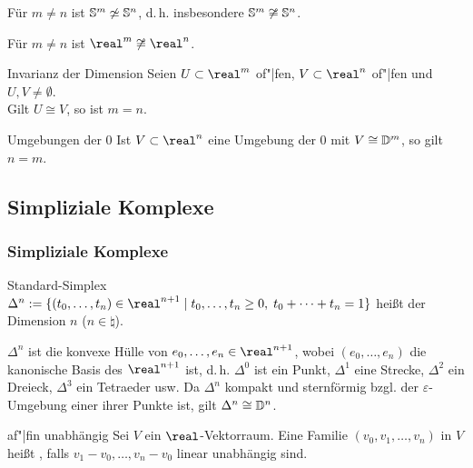 \begin{Kor}
    Für $m \not= n$ ist $\mathbb{S}^m \not\simeq \mathbb{S}^n$, d.\,h.
    insbesondere $\mathbb{S}^m \not\cong \mathbb{S}^n$.
\end{Kor}

\begin{Kor}
    Für $m \not= n$ ist $\real^m \not\cong \real^n$.
\end{Kor}

\begin{Satz}{Invarianz der Dimension}
    Seien $U \subset \real^m$ of"|fen, $V \subset \real^n$ of"|fen und
    $U, V \not= \emptyset$. \\
    Gilt $U \cong V$, so ist $m = n$.
\end{Satz}

\begin{Lemma}{Umgebungen der $0$}
    Ist $V \subset \real^n$ eine Umgebung der $0$ mit $V \cong \mathbb{D}^m$,
    so gilt $n = m$.
\end{Lemma}

\pagebreak

\subsection{%
    Simpliziale Komplexe%
}

\subsubsection{%
    Simpliziale Komplexe%
}

\begin{Def}{Standard-Simplex}
    $\Delta^n := \{(t_0, \dotsc, t_n) \in \real^{n+1} \;|\;
    t_0, \dotsc, t_n \ge 0,\; t_0 + \dotsb + t_n = 1\}$ heißt
     der Dimension $n$ ($n \in \natural$).
\end{Def}

\begin{Bem}
    $\Delta^n$ ist die konvexe Hülle von $e_0, \dotsc, e_n \in \real^{n+1}$,
    wobei $(e_0, \dotsc, e_n)$ die kanonische Basis des $\real^{n+1}$ ist,
    d.\,h. $\Delta^0$ ist ein Punkt, $\Delta^1$ eine Strecke,
    $\Delta^2$ ein Dreieck, $\Delta^3$ ein Tetraeder usw.
    Da $\Delta^n$ kompakt und sternförmig bzgl. der $\varepsilon$-Umgebung
    einer ihrer Punkte ist, gilt $\Delta^n \cong \mathbb{D}^n$.
\end{Bem}

\begin{Def}{af"|fin unabhängig}
    Sei $V$ ein $\real$-Vektorraum.
    Eine Familie $(v_0, v_1, \dotsc, v_n)$ in $V$ heißt
    , falls $v_1 - v_0, \dotsc, v_n - v_0$
    linear unabhängig sind.
\end{Def}

